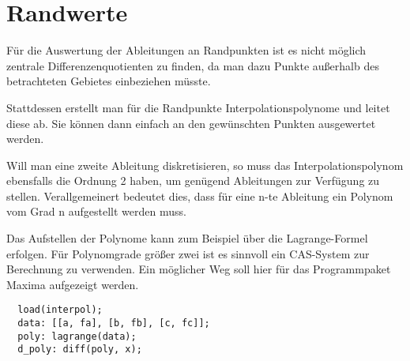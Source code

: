 \documentclass[10pt, ngerman,colorback,accentcolor=tud2d]{tudreport}
\begin{document}
\section{Randwerte}
\label{sec:Randwerte}

Für die Auswertung der Ableitungen an Randpunkten ist es nicht möglich zentrale Differenzenquotienten
zu finden, da man dazu Punkte außerhalb des betrachteten Gebietes einbeziehen müsste.

Stattdessen erstellt man für die Randpunkte Interpolationspolynome und leitet diese ab.
Sie können dann einfach an den gewünschten Punkten ausgewertet werden.

Will man eine zweite Ableitung diskretisieren, so muss das Interpolationspolynom
ebensfalls die Ordnung 2 haben, um genügend Ableitungen zur Verfügung zu stellen.
Verallgemeinert bedeutet dies, dass für eine n-te Ableitung ein Polynom vom Grad n
aufgestellt werden muss.

Das Aufstellen der Polynome kann zum Beispiel über die Lagrange-Formel erfolgen.
Für Polynomgrade größer zwei ist es sinnvoll ein CAS-System zur Berechnung zu verwenden.
Ein möglicher Weg soll hier für das Programmpaket Maxima aufgezeigt werden.

\begin{lstlisting}
  load(interpol);
  data: [[a, fa], [b, fb], [c, fc]];
  poly: lagrange(data);
  d_poly: diff(poly, x);
  
\end{lstlisting}
\end{document}
